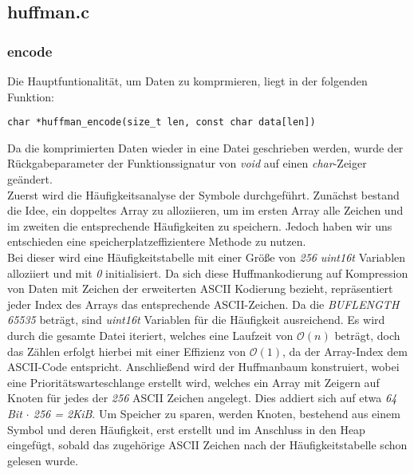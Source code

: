 \documentclass[course=erap]{aspdoc}
\begin{document}
\subsection{huffman.c}
\subsubsection{encode}
\label{sec:encode}

Die Hauptfuntionalität, um Daten zu komprmieren, liegt in der folgenden Funktion:

\begin{center}
    \begin{lstlisting}[frame=single, framerule=0pt, numbers=none]
        char *huffman_encode(size_t len, const char data[len])
    \end{lstlisting}
\end{center}
Da die komprimierten Daten wieder in eine Datei geschrieben werden, wurde der Rückgabeparameter der Funktionssignatur von \textit{void} auf einen \textit{char}-Zeiger geändert.\\
Zuerst wird die Häufigkeitsanalyse der Symbole durchgeführt. Zunächst bestand die Idee, ein doppeltes Array zu alloziieren, um im ersten Array alle Zeichen und im zweiten die entsprechende Häufigkeiten zu speichern. Jedoch haben wir uns entschieden eine speicherplatzeffizientere Methode zu nutzen.\\
Bei dieser wird eine Häufigkeitstabelle mit einer Größe von \textit{256} \textit{uint16\textunderscore t} Variablen alloziiert und mit \textit{0} initialisiert. Da sich diese Huffmankodierung auf Kompression von Daten mit Zeichen der erweiterten ASCII Kodierung bezieht, repräsentiert jeder Index des Arrays das entsprechende ASCII-Zeichen. Da die \textit{BUF\textunderscore LENGTH} \textit{65535} beträgt, sind \textit{uint16\textunderscore t} Variablen für die Häufigkeit ausreichend.
Es wird durch die gesamte Datei iteriert, welches eine Laufzeit von $\mathcal{O}(n)$ beträgt, doch das Zählen erfolgt hierbei mit einer Effizienz von $\mathcal{O}(1)$, da der Array-Index dem ASCII-Code entspricht.
Anschließend wird der Huffmanbaum konstruiert, wobei eine Prioritätswarteschlange erstellt wird, welches ein Array mit Zeigern auf Knoten für jedes der \textit{256} ASCII Zeichen angelegt. Dies addiert sich auf etwa \textit{64 Bit $\cdot$ 256 = 2KiB}. Um Speicher zu sparen, werden Knoten, bestehend aus einem Symbol und deren Häufigkeit, erst erstellt und im Anschluss in den Heap eingefügt, sobald das zugehörige ASCII Zeichen nach der Häufigkeitstabelle schon gelesen wurde.\\
\end{document}

